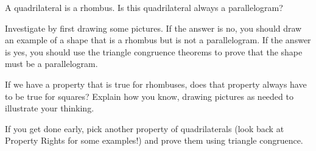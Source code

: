 \documentclass[nooutcomes,noauthor, handout]{ximera}
\begin{document}
\begin{problem}
A quadrilateral is a rhombus. Is this quadrilateral always a parallelogram?


Investigate by first drawing some pictures. If the answer is no, you should draw an example of a shape that is a rhombus but is not a parallelogram. If the answer is yes, you should use the triangle congruence theorems to prove that the shape must be a parallelogram.
\end{problem}


\begin{problem}
If we have a property that is true for rhombuses, does that property always have to be true for squares? Explain how you know, drawing pictures as needed to illustrate your thinking.
\end{problem}


\begin{problem}
If you get done early, pick another property of quadrilaterals (look back at Property Rights for some examples!) and prove them using triangle congruence.
\end{problem}



\pagebreak
\end{document}
